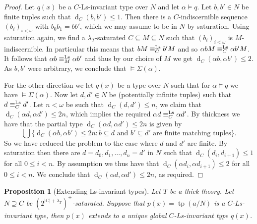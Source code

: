 \documentclass[a4paper, reqno]{amsart}
\newtheorem{proposition}[theorem]{Proposition}
\theoremstyle{definition}
\theoremstyle{repeat}
\DeclareMathOperator{\tp}{tp}
\renewcommand{\d}{\operatorname{d}}
\newcommand{\equivls}{\equiv^\textup{Ls}}
\begin{document}
\begin{proof}
Let $q(x)$ be a $C$-Ls-invariant type over $N$ and let $\alpha \models q$. Let $b, b' \in N$ be finite tuples such that $\d_C(b, b') \leq 1$. Then there is a $C$-indiscernible sequence $(b_i)_{i < \omega}$ with $b_0 b_1 = bb'$, which we may assume to be in $N$ by saturation. Using saturation again, we find a $\lambda_T$-saturated $C \subseteq M \subseteq N$ such that $(b_i)_{i < \omega}$ is $M$-indiscernible. In particular this means that $bM \equivls_C b'M$ and so $\alpha bM \equivls_C \alpha b' M$. It follows that $\alpha b \equivls_M \alpha b'$ and thus by our choice of $M$ we get $\d_C(\alpha b, \alpha b') \leq 2$. As $b, b'$ were arbitrary, we conclude that $\models \Sigma(\alpha)$.

For the other direction we let $q(x)$ be a type over $N$ such that for $\alpha \models q$ we have $\models \Sigma(\alpha)$. Now let $d, d' \in N$ be (potentially infinite tuples) such that $d \equivls_C d'$. Let $n < \omega$ be such that $\d_C(d, d') \leq n$, we claim that $\d_C(\alpha d, \alpha d') \leq 2n$, which implies the required $\alpha d \equivls_C \alpha d'$. By thickness we have that the partial type $\d_C(\alpha d, \alpha d') \leq 2n$ is given by
\[
\bigcup \{ \d_C(\alpha b, \alpha b') \leq 2n : b \subseteq d \text{ and } b' \subseteq d' \text{ are finite matching tuples}\}.
\]
So we have reduced the problem to the case where $d$ and $d'$ are finite. By saturation then there are $d = d_0, d_1, \ldots, d_n = d'$ in $N$ such that $\d_C(d_i, d_{i+1}) \leq 1$ for all $0 \leq i < n$. By assumption we thus have that $\d_C(\alpha d_i, \alpha d_{i+1}) \leq 2$ for all $0 \leq i < n$. We conclude that $\d_C(\alpha d, \alpha d') \leq 2n$, as required.
\end{proof}
\begin{proposition}[Extending Ls-invariant types]
Let $T$ be a thick theory. Let $N \supseteq C$ be $(2^{|C| + \lambda_T})^+$-saturated. Suppose that $p(x) = \tp(a/N)$ is a $C$-Ls-invariant type, then $p(x)$ extends to a unique global $C$-Ls-invariant type $q(x)$.
\end{proposition}
\end{document}
